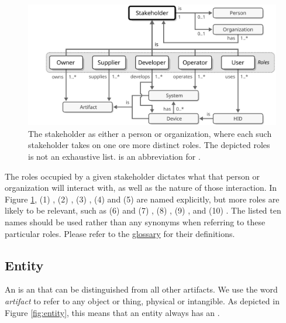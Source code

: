 \begin{figure}[ht!]
  \centering
  \includegraphics[scale=0.9]{figures/stakeholder}
  \caption{
    The stakeholder as either a person or organization, where each such stakeholder takes on one ore more distinct roles.
    The depicted roles is not an exhaustive list.
     is an abbreviation for .
  }
  \label{fig:stakeholder}
\end{figure}

\vspace*{0.1cm}

The roles occupied by a given stakeholder dictates what  that person or organization will interact with, as well as the nature of those interaction.
In Figure \ref{fig:stakeholder}, (1) , (2) , (3) , (4)  and (5)  are named explicitly, but more roles are likely to be relevant, such as (6)  and (7) , (8) , (9) , and (10) .
The listed ten names should be used rather than any synonyms when referring to these particular roles.
Please refer to the \hyperref[sec:glossary]{glossary} for their definitions.

\subsection{Entity}
\label{sec:concepts:entity}

An  is an  that can be distinguished from all other artifacts.
We use the word \textit{artifact} to refer to any object or thing, physical or intangible.
As depicted in Figure \ref{fig:entity}, this means that an entity always has an .


